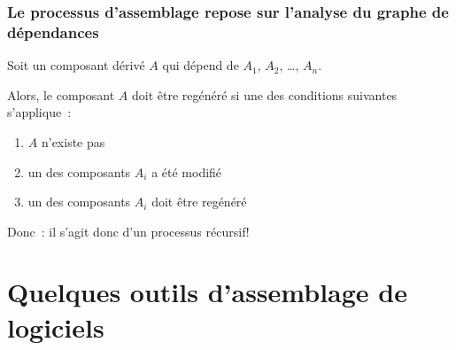 \begin{frame}
\frametitle{Le processus d'assemblage repose sur l'analyse du graphe
de d\'ependances}

Soit un composant d\'eriv\'e $A$ qui d\'epend de $A_1$, $A_2$, \ldots,
$A_n$.


\bigskip

Alors, le composant \alert{$A$ doit \^etre reg\'en\'er\'e} si une des
conditions suivantes s'applique~:
\begin{enumerate}
\item $A$ n'existe pas

\item un des composants $A_i$ a \'et\'e modifi\'e

\item un des composants $A_i$ doit \^etre reg\'en\'er\'e

\end{enumerate}

\VF

\alert{Donc~: } il s'agit donc d'un processus \alert{r\'ecursif}!


\NOTE{\ }

\end{frame}

\section{Quelques outils d'assemblage de logiciels}













